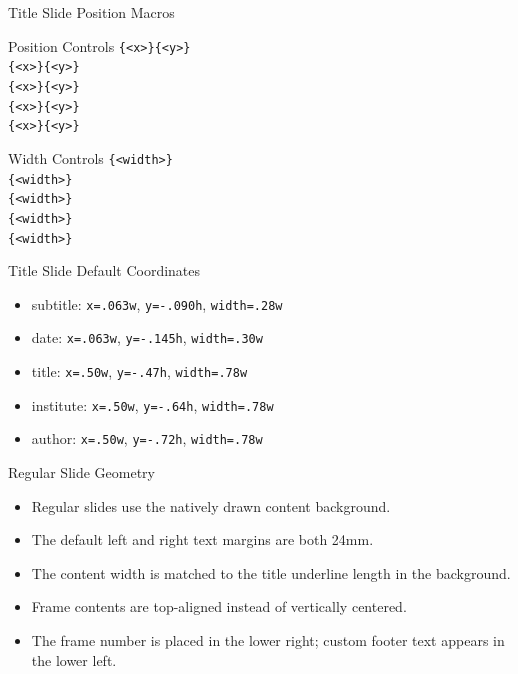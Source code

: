 \documentclass[10pt]{beamer}
\begin{document}
\begin{frame}{Title Slide Position Macros}
\begin{block}{Position Controls}
\texttt{\string\enlpsetsubtitleposition\{<x>\}\{<y>\}}\\
\texttt{\string\enlpsetdateposition\{<x>\}\{<y>\}}\\
\texttt{\string\enlpsettitleposition\{<x>\}\{<y>\}}\\
\texttt{\string\enlpsetinstituteposition\{<x>\}\{<y>\}}\\
\texttt{\string\enlpsetauthorposition\{<x>\}\{<y>\}}
\end{block}
\begin{block}{Width Controls}
\texttt{\string\enlpsetsubtitlewidth\{<width>\}}\\
\texttt{\string\enlpsetdatewidth\{<width>\}}\\
\texttt{\string\enlpsettitlewidth\{<width>\}}\\
\texttt{\string\enlpsetinstitutewidth\{<width>\}}\\
\texttt{\string\enlpsetauthorwidth\{<width>\}}
\end{block}
\end{frame}

\begin{frame}{Title Slide Default Coordinates}
  \begin{itemize}
    \item subtitle: \texttt{x=.063w}, \texttt{y=-.090h}, \texttt{width=.28w}
    \item date: \texttt{x=.063w}, \texttt{y=-.145h}, \texttt{width=.30w}
    \item title: \texttt{x=.50w}, \texttt{y=-.47h}, \texttt{width=.78w}
    \item institute: \texttt{x=.50w}, \texttt{y=-.64h}, \texttt{width=.78w}
    \item author: \texttt{x=.50w}, \texttt{y=-.72h}, \texttt{width=.78w}
  \end{itemize}
\end{frame}

\begin{frame}{Regular Slide Geometry}
  \begin{itemize}
    \item Regular slides use the natively drawn content background.
    \item The default left and right text margins are both 24mm.
    \item The content width is matched to the title underline length in the background.
    \item Frame contents are top-aligned instead of vertically centered.
    \item The frame number is placed in the lower right; custom footer text appears in the lower left.
  \end{itemize}
\end{frame}
\end{document}

